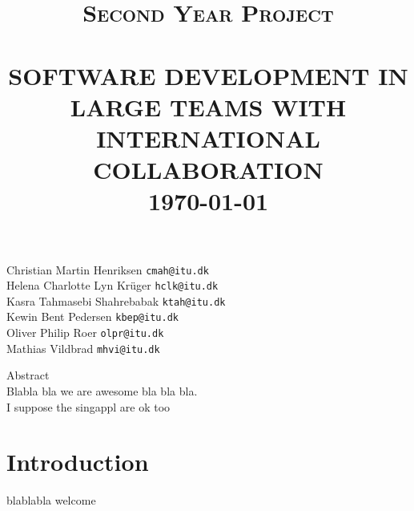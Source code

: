 \documentclass[10pt,a4paper]{article}
\title{\LARGE \textsc{Second Year Project} 	%
		 	\\[2.0cm]													%
			\HRule{0.5pt} \\										%
			\LARGE \textbf{\uppercase{Software Development in Large Teams with International Collaboration}}	%
			\HRule{2pt} \\ [0.5cm]								%
			\normalsize \today		 %
			\\[3.0cm]							
		}
\makeatletter
\def\printtitle{%
    {\centering \@title\par}}
\makeatother
\begin{document}
\thispagestyle{empty}				%

\printtitle									%

{
\center 
Christian Martin Henriksen \texttt{cmah@itu.dk} \\ [0.5cm]
Helena Charlotte Lyn Kr\"uger \texttt{hclk@itu.dk} \\ [0.5cm]
Kasra Tahmasebi Shahrebabak \texttt{ktah@itu.dk} \\ [0.5cm]
Kewin Bent Pedersen \texttt{kbep@itu.dk} \\ [0.5cm]
Oliver Philip Roer \texttt{olpr@itu.dk} \\  [0.5cm]
Mathias Vildbrad \texttt{mhvi@itu.dk} \\[0.5cm] 
}

\newpage

\oddsidemargin 0.0in
\textwidth 6.5in

{\large Abstract} \\
Blabla bla we are awesome bla bla bla. \\
I suppose the singappl are ok too
\newpage

\tableofcontents

\newpage
\section{Introduction}
blablabla welcome
\end{document}
